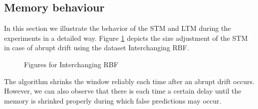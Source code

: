 \documentclass[conference]{IEEEtran}
\begin{document}
\subsection{Memory behaviour}
In this section we illustrate the behavior of the STM and LTM during the experiments in a detailed way. 
Figure \ref{fig:abrupt} depicts the size adjustment of the STM in case of abrupt drift using the dataset Interchanging RBF. 
\begin{figure}
\centering
	\vspace{0 pt}
\caption{Figures for Interchanging RBF}
\label{fig:abrupt}
\end{figure}
The algorithm shrinks the window reliably each time after an abrupt drift occurs.
However, we can also observe that there is each time a certain delay until the memory is shrinked properly during which false predictions may occur. 
\end{document}
